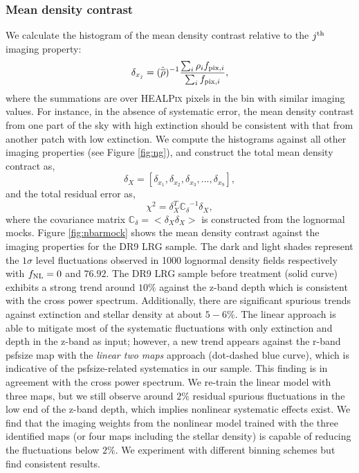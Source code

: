 \subsubsection{Mean density contrast}
We calculate the histogram of the mean density contrast relative to the $j^{\rm th}$ imaging property:
\begin{equation}
\delta_{x_{j}} = ({\hat{\overline{\rho}}})^{-1} \frac{\sum_{i} \rho_{i} f_{{\rm pix}, i}}{\sum_{i} f_{{\rm pix}, i}},
\end{equation}
where the summations are over \textsc{HEALPix} pixels in the bin with similar imaging values. For instance, in the absence of systematic error, the mean density contrast from one part of the sky with high extinction should be consistent with that from another patch with low extinction. We compute the histograms against all other imaging properties (see Figure \ref{fig:ng}), and construct the total mean density contract as,
\begin{equation}
\delta_{X} = [\delta_{x_{1}}, \delta_{x_{2}}, \delta_{x_{3}}, ..., \delta_{x_{9}}],
\end{equation}
and the total residual error as,
\begin{equation}
\chi^{2} = \delta_{X}^{T} \mathbb{C_{\delta}}^{-1} \delta_{X},
\end{equation}
where the covariance matrix $\mathbb{C}_{\delta} = < \delta_{X} \delta_{X}>$ is constructed from the lognormal mocks. Figure \ref{fig:nbarmock} shows the mean density contrast against the imaging properties for the DR9 LRG sample. The dark and light shades represent the $1\sigma$ level fluctuations observed in 1000 lognormal density fields respectively with $f_{\rm NL}=0$ and $76.92$. The DR9 LRG sample before treatment (solid curve) exhibits a strong trend around $10\%$ against the z-band depth which is consistent with the cross power spectrum. Additionally, there are significant spurious trends against extinction and stellar density at about $5-6\%$. The linear approach is able to mitigate most of the systematic fluctuations with only extinction and depth in the z-band as input; however,  a new trend appears against the r-band psfsize map with the \textit{linear two maps} approach (dot-dashed blue curve), which is indicative of the psfsize-related systematics in our sample. This finding is in agreement with the cross power spectrum. We re-train the linear model with three maps, but we still observe around $2\%$ residual spurious fluctuations in the low end of the z-band depth, which implies nonlinear systematic effects exist. We find that the imaging weights from the nonlinear model trained with the three identified maps (or four maps including the stellar density) is capable of reducing the fluctuations below $2\%$. We experiment with different binning schemes but find consistent results.

